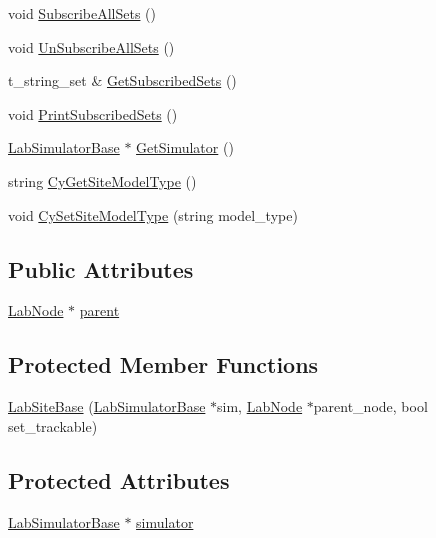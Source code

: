 \begin{DoxyCompactItemize}
void \hyperlink{classelps_1_1_lab_site_base_a5d8996bca2f83c16b030c404ffc14fcd}{Subscribe\+All\+Sets} ()
\item 
void \hyperlink{classelps_1_1_lab_site_base_a402f47fa4587c8478974437dea7f11eb}{Un\+Subscribe\+All\+Sets} ()
\item 
t\+\_\+string\+\_\+set \& \hyperlink{classelps_1_1_lab_site_base_ae1e74a24ef6a40d69d0f288b9e0d8ff3}{Get\+Subscribed\+Sets} ()
\item 
void \hyperlink{classelps_1_1_lab_site_base_a807f6e3daebf22071acfd9d16b8941ae}{Print\+Subscribed\+Sets} ()
\item 
\hyperlink{classelps_1_1_lab_simulator_base}{Lab\+Simulator\+Base} $\ast$ \hyperlink{classelps_1_1_lab_site_base_ac96a305fcabb01e40719d246baef0f9c}{Get\+Simulator} ()
\item 
string \hyperlink{classelps_1_1_lab_site_base_a0109367878d48b1b0d0c21000c8e6862}{Cy\+Get\+Site\+Model\+Type} ()
\item 
void \hyperlink{classelps_1_1_lab_site_base_a50f756a34616afd53986d002b2203ee4}{Cy\+Set\+Site\+Model\+Type} (string model\+\_\+type)
\end{DoxyCompactItemize}
\subsection*{Public Attributes}
\begin{DoxyCompactItemize}
\item 
\hyperlink{classelps_1_1_lab_node}{Lab\+Node} $\ast$ \hyperlink{classelps_1_1_lab_site_base_a51cd67cf2970d70ea331e37ff5b77a44}{parent}
\end{DoxyCompactItemize}
\subsection*{Protected Member Functions}
\begin{DoxyCompactItemize}
\item 
\hyperlink{classelps_1_1_lab_site_base_a1dd99add3d04c734eb25a45b2f760c27}{Lab\+Site\+Base} (\hyperlink{classelps_1_1_lab_simulator_base}{Lab\+Simulator\+Base} $\ast$sim, \hyperlink{classelps_1_1_lab_node}{Lab\+Node} $\ast$parent\+\_\+node, bool set\+\_\+trackable)
\end{DoxyCompactItemize}
\subsection*{Protected Attributes}
\begin{DoxyCompactItemize}
\item 
\hyperlink{classelps_1_1_lab_simulator_base}{Lab\+Simulator\+Base} $\ast$ \hyperlink{classelps_1_1_lab_site_base_a5b8dbbdad3e4484493203bf2b89b3878}{simulator}
\end{DoxyCompactItemize}


